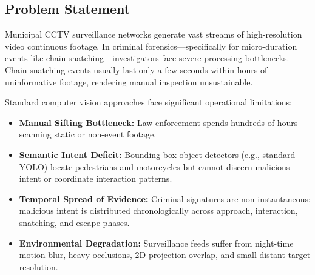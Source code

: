 \documentclass[11pt, a4paper]{article}
\begin{document}
\subsection{Problem Statement}
Municipal CCTV surveillance networks generate vast streams of high-resolution video continuous footage. In criminal forensics—specifically for micro-duration events like chain snatching—investigators face severe processing bottlenecks. Chain-snatching events usually last only a few seconds within hours of uninformative footage, rendering manual inspection unsustainable.

Standard computer vision approaches face significant operational limitations:
\begin{itemize}[leftmargin=*, noitemsep]
    \item \textbf{Manual Sifting Bottleneck:} Law enforcement spends hundreds of hours scanning static or non-event footage.
    \item \textbf{Semantic Intent Deficit:} Bounding-box object detectors (e.g., standard YOLO) locate pedestrians and motorcycles but cannot discern malicious intent or coordinate interaction patterns.
    \item \textbf{Temporal Spread of Evidence:} Criminal signatures are non-instantaneous; malicious intent is distributed chronologically across approach, interaction, snatching, and escape phases.
    \item \textbf{Environmental Degradation:} Surveillance feeds suffer from night-time motion blur, heavy occlusions, 2D projection overlap, and small distant target resolution.
\end{itemize}
\end{document}
